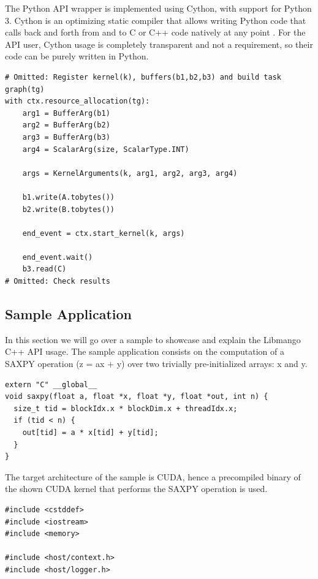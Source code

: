 The Python API wrapper is implemented using Cython, with support for Python 3. Cython is an optimizing static compiler that allows writing Python code that calls back and forth from and to C or C++ code natively at any point \cite{cython}.
For the API user, Cython usage is completely transparent and not a requirement, so their code can be purely written in Python. 

\begin{lstlisting}[style=PythonStyle, caption=Python API Example snippet]
# Omitted: Register kernel(k), buffers(b1,b2,b3) and build task graph(tg)
with ctx.resource_allocation(tg):
    arg1 = BufferArg(b1)
    arg2 = BufferArg(b2)
    arg3 = BufferArg(b3)
    arg4 = ScalarArg(size, ScalarType.INT)

    args = KernelArguments(k, arg1, arg2, arg3, arg4)

    b1.write(A.tobytes())
    b2.write(B.tobytes())

    end_event = ctx.start_kernel(k, args)

    end_event.wait()
    b3.read(C)
# Omitted: Check results
\end{lstlisting}


\subsection{Sample Application}

In this section we will go over a sample to showcase and explain the Libmango C++ API usage. The sample application consists on the computation of a SAXPY operation (z = ax + y) over two trivially pre-initialized arrays: x and y. 

\begin{lstlisting}[style=CStyle, label=saxpycu, caption=saxpy.cu]
extern "C" __global__ 
void saxpy(float a, float *x, float *y, float *out, int n) {
  size_t tid = blockIdx.x * blockDim.x + threadIdx.x;
  if (tid < n) {
    out[tid] = a * x[tid] + y[tid];
  }
}
\end{lstlisting}

The target architecture of the sample is CUDA, hence a precompiled binary of the shown CUDA kernel that performs the SAXPY operation is used.

\begin{lstlisting}[style=CStyle, caption=Sample - Includes]
#include <cstddef>
#include <iostream>
#include <memory>

#include <host/context.h>
#include <host/logger.h>
\end{lstlisting}

